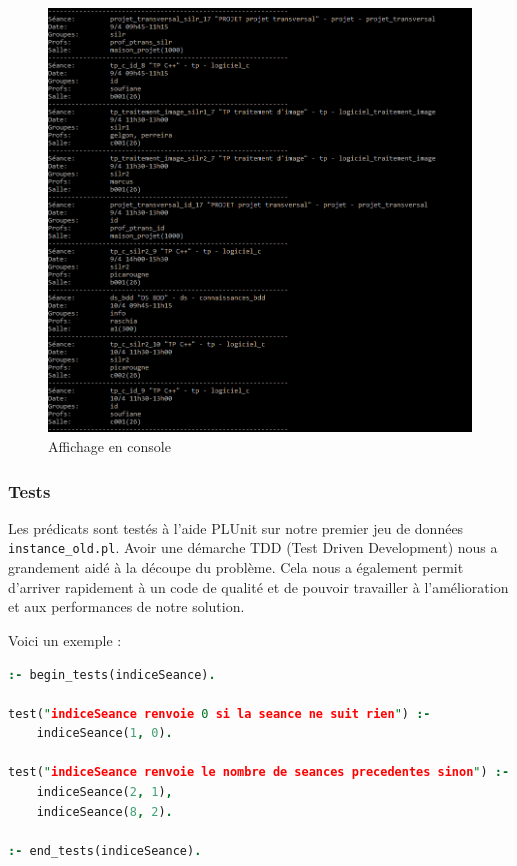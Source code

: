 \begin{figure}[H]
	\centering
    \includegraphics[keepaspectratio=true,width=12cm]{affichage.png}
        \caption{\label{fig:affi_sortie} Affichage en console}
\end{figure}


\subsubsection{Tests}

Les prédicats sont testés à l'aide PLUnit sur notre premier jeu de données
\texttt{instance\_old.pl}. Avoir une démarche TDD (Test Driven Development) nous
a grandement aidé à la découpe du problème. Cela nous a également permit
d'arriver rapidement à un code de qualité et de pouvoir travailler à
l'amélioration et aux performances de notre solution.

Voici un exemple :

\begin{lstlisting}[language=Prolog, caption=Exemple de test, captionpos=b,
label={lst:test}]
:- begin_tests(indiceSeance).

test("indiceSeance renvoie 0 si la seance ne suit rien") :-
    indiceSeance(1, 0).

test("indiceSeance renvoie le nombre de seances precedentes sinon") :-
    indiceSeance(2, 1),
    indiceSeance(8, 2).

:- end_tests(indiceSeance).
\end{lstlisting}

